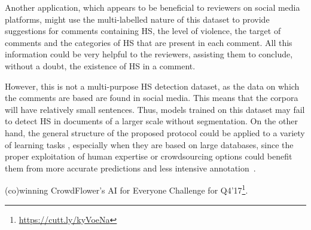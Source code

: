 \documentclass[sigconf]{acmart}
\begin{document}
Another application, which appears to be beneficial to reviewers on social media platforms, might use the multi-labelled nature of this dataset to provide suggestions for comments containing HS, the level of violence, the target of comments and the categories of HS that are present in each comment. All this information could be very helpful to the reviewers, assisting them to conclude, without a doubt, the existence of HS in a comment.

However, this is not a multi-purpose HS detection dataset, as the data on which the comments are based are found in social media. This means that the corpora will have relatively small sentences. Thus, models trained on this dataset may fail to detect HS in documents of a larger scale without segmentation. On the other hand, the general structure of the proposed protocol could be applied to a variety of learning tasks , especially when they are based on large databases, since the proper exploitation of human expertise or crowdsourcing options could benefit them from more accurate predictions and less intensive annotation~\cite{DBLP:journals/biomedsem/DrameMD16}.

\begin{acks}
(co)winning CrowdFlower’s AI for Everyone Challenge for Q4'17\footnote{\url{https://cutt.ly/kyVoeNa}}.
\end{acks}


\end{document}
